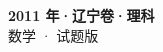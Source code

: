 \documentclass[zihao=-4, a4paper]{ctexart}
\begin{document}
\begin{center}
  {\Large\bfseries 2011 年·辽宁卷·理科}\\[4pt]
  {\large 数学 · 试题版}
\end{center}
\medskip
{}

\end{document}
